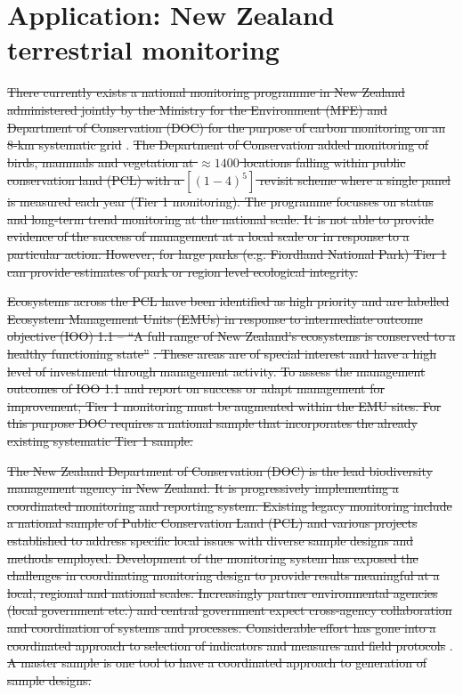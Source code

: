 \documentclass[titlepage]{article}
\begin{document}
\section{Application: New Zealand terrestrial monitoring}
\st{There currently exists a national monitoring programme in New Zealand administered jointly by the Ministry for the Environment (MFE) and Department of Conservation (DOC) for the purpose of carbon monitoring on an 8-km systematic grid} \citep{Coomes2002}. \st{The Department of Conservation added monitoring of birds, mammals and vegetation at $\approx 1400$ locations falling within public conservation land (PCL) with a $[(1-4)^5]$ revisit scheme where a single panel is measured each year (Tier 1 monitoring). The programme focusses on status and long-term trend monitoring at the national scale. It is not able to provide evidence of the success of management at a local scale or in response to a particular action. However, for large parks (e.g. Fiordland National Park) Tier 1 can provide estimates of park or region level ecological integrity.}

\st{Ecosystems across the PCL have been identified as high priority and are labelled Ecosystem Management Units (EMUs) in response to intermediate outcome objective (IOO) 1.1 -- ``A full range of New Zealand's ecosystems is conserved to a healthy functioning state'' }\citep{DOCIOO}\st{. These areas are of special interest and have a high level of investment through management activity. To assess the management outcomes of IOO 1.1 and report on success or adapt management for improvement, Tier 1 monitoring must be augmented within the EMU sites. For this purpose DOC requires a national sample that incorporates the already existing systematic Tier 1 sample.}

\st{The New Zealand Department of Conservation (DOC) is the lead biodiversity management agency in New Zealand. It is progressively implementing a coordinated monitoring and reporting system. Existing legacy monitoring include a national sample of Public Conservation Land (PCL) and various projects established to address specific local issues with diverse sample designs and methods employed. Development of the monitoring system has exposed the challenges in coordinating monitoring design to provide results meaningful at a local, regional and national scales. Increasingly partner environmental agencies (local government etc.) and central government expect cross-agency collaboration and coordination of systems and processes. Considerable effort has gone into a coordinated approach to selection of indicators and measures and field protocols} \cite{DOC}. \st{A master sample is one tool to have a coordinated approach to generation of sample designs.}  
\end{document}
